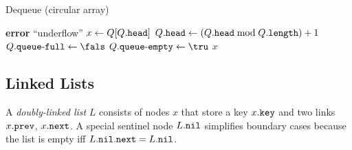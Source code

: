 \begin{algorithm}[htb]
  \caption{Dequeue (circular array)}
  \label{alg:dequeue}
  \begin{algorithmic}[1]
        \State \textbf{error} ``underflow''
      \EndIf
      \State $x \gets Q[Q\mathtt{.}\mathtt{head}]$
      \State $Q\mathtt{.}\mathtt{head} \gets (Q\mathtt{.}\mathtt{head} \bmod Q\mathtt{.}\mathtt{length}) + 1$
      \State $\attrib{Q}{queue\mbox{-}full} \gets \fals$
        \State $\attrib{Q}{queue\mbox{-}empty} \gets \tru$
      \EndIf
      \State \Return $x$
    \EndFunction
  \end{algorithmic}
\end{algorithm}


\subsection{Linked Lists}
\label{subsec:linked_lists}

\begin{definition}
  A \emph{doubly-linked list} \(L\) consists of nodes \(x\) that store a key \(x\mathtt{.}\mathtt{key}\) and two links \(x\mathtt{.}\mathtt{prev}\), \(x\mathtt{.}\mathtt{next}\).
  A special sentinel node \(L\mathtt{.}\mathtt{nil}\) simplifies boundary cases because the list is empty iff \(L\mathtt{.}\mathtt{nil}\mathtt{.}\mathtt{next} = L\mathtt{.}\mathtt{nil}\).
  \end{definition}


